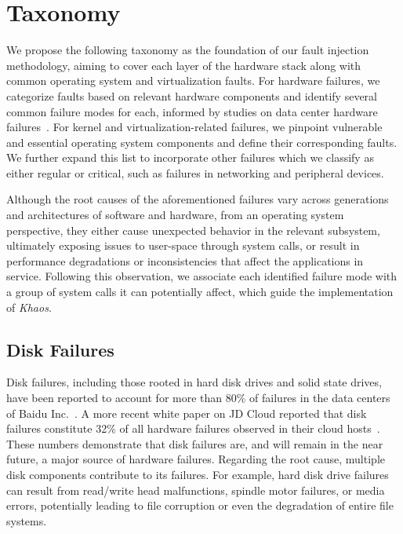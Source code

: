 \section{Taxonomy}

We propose the following taxonomy as the foundation of our fault injection methodology, aiming to cover each layer of the hardware stack along with common operating system and virtualization faults. For hardware failures, we categorize faults based on relevant hardware components and identify several common failure modes for each, informed by studies on data center hardware failures~\cite{Wang2017, intel2023mca}. For kernel and virtualization-related failures, we pinpoint vulnerable and essential operating system components and define their corresponding faults. We further expand this list to incorporate other failures which we classify as either regular or critical, such as failures in networking and peripheral devices.

Although the root causes of the aforementioned failures vary across generations and architectures of software and hardware, from an operating system perspective, they either cause unexpected behavior in the relevant subsystem, ultimately exposing issues to user-space through system calls, or result in performance degradations or inconsistencies that affect the applications in service. Following this observation, we associate each identified failure mode with a group of system calls it can potentially affect, which guide the implementation of \textit{Khaos}.

\subsection{Disk Failures}

Disk failures, including those rooted in hard disk drives and solid state drives, have been reported to account for more than 80\% of failures in the data centers of Baidu Inc.~\cite{Wang2017}. A more recent white paper on JD Cloud reported that disk failures constitute 32\% of all hardware failures observed in their cloud hosts~\cite{intel2023mca}.
These numbers demonstrate that disk failures are, and will remain in the near future, a major source of hardware failures. Regarding the root cause, multiple disk components contribute to its failures. For example, hard disk drive failures can result from read/write head malfunctions, spindle motor failures, or media errors, potentially leading to file corruption or even the degradation of entire file systems.

